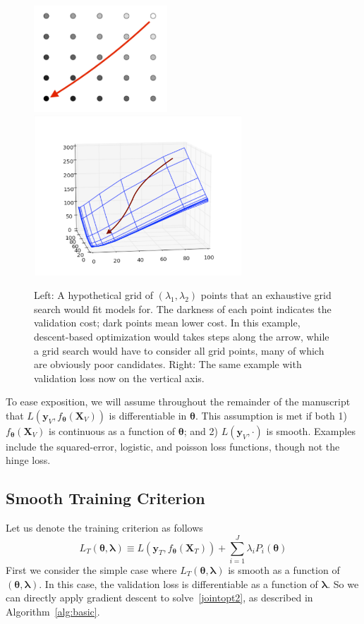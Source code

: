 \documentclass[12pt,letterpaper]{article}
\begin{document}
\begin{figure}
\begin{center}
\includegraphics[height=40mm]{grid_search_vs_descent.pdf}
\includegraphics[height=60mm]{surface_in_regularization_parameters.pdf}
\end{center}
\caption{Left: A hypothetical grid of $(\lambda_1,\lambda_2)$ points that an exhaustive grid search would fit models for. The darkness of each point indicates the validation cost; dark points mean lower cost. In this example, descent-based optimization would takes steps along the arrow, while a grid search would have to consider all grid points, many of which are obviously poor candidates. Right: The same example with validation loss now on the vertical axis.}
\label{fig:compare}
\end{figure}

To ease exposition, we will assume throughout the remainder of the manuscript that $L \left( \boldsymbol{y}_V, f_{\boldsymbol \theta}(\boldsymbol{X}_V) \right)$ is differentiable in $\boldsymbol \theta$. This assumption is met if both 1) $f_{\boldsymbol \theta}(\boldsymbol{X}_V)$ is continuous as a function of $\boldsymbol \theta$; and 2) $L\left(\boldsymbol{y}_V,\cdot\right)$ is smooth. Examples include the squared-error, logistic, and poisson loss functions, though not the hinge loss.

\subsection{Smooth Training Criterion}
Let us denote the training criterion as follows
\begin{equation}
L_T\left(\boldsymbol \theta, \boldsymbol{\lambda}\right) \equiv L(\boldsymbol{y}_T, f_{\boldsymbol \theta} (\boldsymbol{X}_T)) + \sum\limits_{i=1}^J \lambda_i P_i(\boldsymbol \theta)
\label{train}
\end{equation}
First we consider the simple case where $L_T\left(\boldsymbol \theta, \boldsymbol{\lambda}\right)$ is smooth as a function of $(\boldsymbol \theta, \boldsymbol{\lambda})$. In this case, the validation loss is differentiable as a function of $\boldsymbol{\lambda}$. So we can directly apply gradient descent to solve~\eqref{jointopt2}, as described in Algorithm~\ref{alg:basic}.
\end{document}
